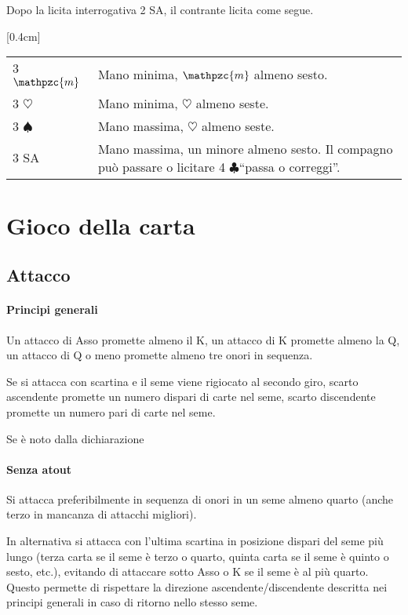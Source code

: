 \documentclass[a4paper,10pt]{article}
\renewcommand{\c}{$\clubsuit$\xspace}
\newcommand{\h}{$\heartsuit$\xspace}
\newcommand{\s}{$\spadesuit$\xspace}
\newcommand{\sa}{SA\xspace}
\newcommand{\m}{$\mathpzc{m}$\xspace}
\newcommand{\smallspace}{\vskip0.3cm}
\renewcommand{\tabcolsep}{0.3cm}
\newenvironment{twocol}
  {\smallspace\noindent\begin{tabular}{l p{0.78\textwidth}}}
  {\end{tabular}\smallspace}
\newcommand{\biddingtable}[2][0.4cm]{
  \needspace{1cm}
  \marginnote{
    \scriptsize{
    \def\arraystretch{1.5}
    \renewcommand{\tabcolsep}{0.1cm}
    \begin{tabular}{|>{\centering\arraybackslash}p{0.6cm}>{\centering\arraybackslash}p{0.6cm}>{\centering\arraybackslash}p{0.6cm}>{\centering\arraybackslash}p{0.6cm}|}
      \hline
      #2
    \end{tabular}
    }
  }[#1]
}
\begin{document}
Dopo la licita interrogativa 2 \sa, il contrante licita come segue.
\biddingtable{1 \s & P & 2 \s & P \\ P & X & P & 2 \sa \\ P & * &&}
\begin{twocol}
	3 \m & Mano minima, \m almeno sesto.\\
	3 \h & Mano minima, \h almeno seste.\\
	3 \s & Mano massima, \h almeno seste.\\
	3 \sa & Mano massima, un minore almeno sesto. Il compagno può passare o licitare 4 \c ``passa o correggi''.\\
\end{twocol}

\pagebreak

\section{Gioco della carta}

\subsection{Attacco}

\paragraph{Principi generali} Un attacco di Asso promette almeno il K, un attacco di K promette almeno la Q, un attacco di Q o meno promette almeno tre onori in sequenza.

Se si attacca con scartina e il seme viene rigiocato al secondo giro, scarto ascendente promette un numero dispari di carte nel seme, scarto discendente promette un numero pari di carte nel seme.

Se è noto dalla dichiarazione

\paragraph{Senza atout} Si attacca preferibilmente in sequenza di onori in un seme almeno quarto (anche terzo in mancanza di attacchi migliori).

In alternativa si attacca con l'ultima scartina in posizione dispari del seme più lungo (terza carta se il seme è terzo o quarto, quinta carta se il seme è quinto o sesto, etc.), evitando di attaccare sotto Asso o K se il seme è al più quarto. Questo permette di rispettare la direzione ascendente/discendente descritta nei principi generali in caso di ritorno nello stesso seme.
\end{document}
